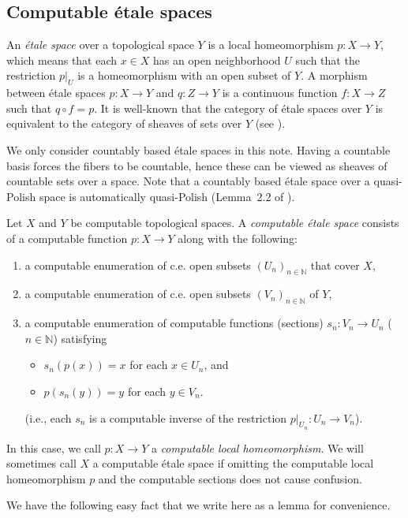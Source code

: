 \documentclass[envcountsame]{llncs}
\def\IN{{\mathbb N}}
\begin{document}
\subsection{Computable \'{e}tale spaces}

An \emph{\'{e}tale space} over a topological space $Y$ is a local homeomorphism $p\colon X\to Y$, which means that each $x\in X$ has an open neighborhood $U$ such that the restriction $p|_U$ is a homeomorphism with an open subset of $Y$. A morphism between \'{e}tale spaces $p\colon X\to Y$ and $q\colon Z\to Y$ is a continuous function $f\colon X\to Z$ such that $q\circ f = p$. It is well-known that the category of \'{e}tale spaces over $Y$ is equivalent to the category of sheaves of sets over $Y$ (see \cite{MM92}).

We only consider countably based \'{e}tale spaces in this note. Having a countable basis forces the fibers to be countable, hence these can be viewed as sheaves of countable sets over a space. Note that a countably based \'{e}tale space over a quasi-Polish space is automatically quasi-Polish (Lemma~2.2 of \cite{Chen19}).

Let $X$ and $Y$ be computable topological spaces. A \emph{computable \'{e}tale space} consists of a computable function $p\colon X\to Y$ along with the following:
\begin{enumerate}
\item
a computable enumeration of c.e. open subsets $(U_n)_{n\in\IN}$ that cover $X$,
\item
a computable enumeration of c.e. open subsets $(V_n)_{n\in\IN}$ of $Y$,
\item
a computable enumeration of computable functions (sections) $s_n\colon V_n \to U_n$ ($n\in\IN$) satisfying 
\begin{itemize}
\item
$s_n(p(x)) = x$ for each $x\in U_n$, and
\item
$p(s_n(y)) = y$ for each $y\in V_n$.
\end{itemize}
(i.e., each $s_n$ is a computable inverse of the restriction $p|_{U_n}\colon U_n\to V_n$). 
\end{enumerate}
In this case, we call $p\colon X\to Y$ a \emph{computable local homeomorphism}. We will sometimes call $X$ a computable \'{e}tale space if omitting the computable local homeomorphism $p$ and the computable sections does not cause confusion.

We have the following easy fact that we write here as a lemma for convenience.
\end{document}

